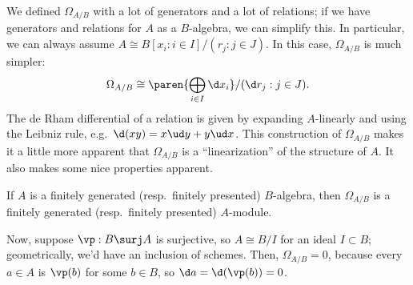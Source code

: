 We defined \(\Omega_{A/B}\) with a lot of generators and a lot of relations; if we have generators and relations
for \(A\) as a \(B\)-algebra, we can simplify this. In particular, we can always assume \(A\cong B[x_i: i\in
I]/(r_j: j\in J)\). In this case, \(\Omega_{A/B}\) is much simpler:
\[\Omega_{A/B}\cong\paren{\bigoplus_{i\in I} \d x_i}/(\d r_j: j\in J).\]
The de Rham differential of a relation is given by expanding \(A\)-linearly and using the Leibniz rule, e.g.\
\(\d(xy) = x\ud y + y\ud x\). This construction of \(\Omega_{A/B}\) makes it a little more apparent that
\(\Omega_{A/B}\) is a ``linearization'' of the structure of \(A\). It also makes some nice properties apparent.
\begin{cor}
If \(A\) is a finitely generated (resp.\ finitely presented) \(B\)-algebra, then \(\Omega_{A/B}\) is a finitely
generated (resp.\ finitely presented) \(A\)-module.
\end{cor}
Now, suppose \(\vp:B\surj A\) is surjective, so \(A\cong B/I\) for an ideal \(I\subset B\); geometrically, we'd
have an inclusion of schemes. Then, \(\Omega_{A/B} = 0\), because every \(a\in A\) is \(\vp(b)\) for some \(b\in
B\), so \(\d a = \d(\vp(b)) = 0\).

